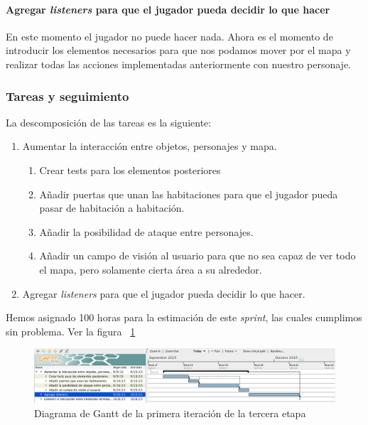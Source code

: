 \paragraph{Agregar \textit{listeners} para que el jugador pueda decidir lo que hacer} En este momento el jugador no puede hacer nada. Ahora es el momento de introducir los elementos necesarios para que nos podamos mover por el mapa y realizar todas las acciones implementadas anteriormente con nuestro personaje.

\subsubsection{Tareas y seguimiento}

La descomposición de las tareas es la siguiente:

\begin{enumerate}[label=\bfseries WBS 1.\arabic*]
  \item Aumentar la interacción entre objetos, personajes y mapa.
    \begin{enumerate}[label=\bfseries WBS 1.1.\arabic*]
      \item Crear tests para los elementos posteriores
      \item Añadir puertas que unan las habitaciones para que el jugador pueda pasar de habitación a habitación.
      \item Añadir la posibilidad de ataque entre personajes.
      \item Añadir un campo de visión al usuario para que no sea capaz de ver todo el mapa, pero solamente cierta área a su alrededor.
    \end{enumerate}
  \item Agregar \textit{listeners} para que el jugador pueda decidir lo que hacer.
\end{enumerate}

Hemos asignado 100 horas para la estimación de este \textit{sprint}, las cuales cumplimos sin problema. Ver la figura ~\ref{fig:sec3it1}

\begin{figure}
    \includegraphics[width=\textwidth,height=\textheight,keepaspectratio]{./img/sec3it1.png}
  \caption{Diagrama de Gantt de la primera iteración de la tercera etapa}
  \label{fig:sec3it1}
\end{figure}

